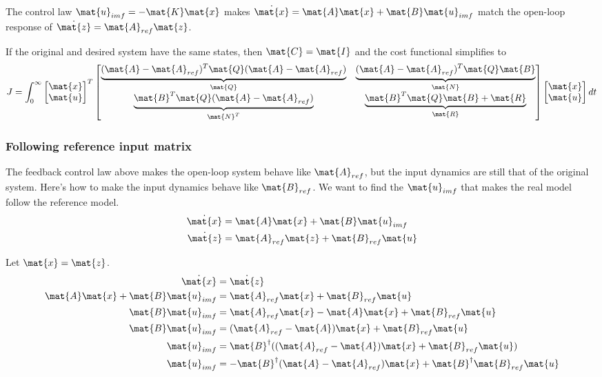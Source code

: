 The control law $\mat{u}_{imf} = -\mat{K}\mat{x}$ makes
$\dot{\mat{x}} = \mat{A}\mat{x} + \mat{B}\mat{u}_{imf}$ match the open-loop
response of $\dot{\mat{z}} = \mat{A}_{ref}\mat{z}$.

If the original and desired system have the same states, then
$\mat{C} = \mat{I}$ and the cost functional simplifies to
\begin{equation}
  J = \int_0^\infty
  \begin{bmatrix}
    \mat{x} \\
    \mat{u}
  \end{bmatrix}^T
  \begin{bmatrix}
    \underbrace{(\mat{A} - \mat{A}_{ref})^T\mat{Q}
      (\mat{A} - \mat{A}_{ref})}_{\mat{Q}} &
    \underbrace{(\mat{A} - \mat{A}_{ref})^T\mat{Q}\mat{B}}_{\mat{N}} \\
    \underbrace{\mat{B}^T\mat{Q}(\mat{A} - \mat{A}_{ref})}_{\mat{N}^T} &
    \underbrace{\mat{B}^T\mat{Q}\mat{B} + \mat{R}}_{\mat{R}}
  \end{bmatrix}
  \begin{bmatrix}
    \mat{x} \\
    \mat{u}
  \end{bmatrix}
  dt
\end{equation}

\subsubsection{Following reference input matrix}

The feedback control law above makes the open-loop system behave like
$\mat{A}_{ref}$, but the input dynamics are still that of the original system.
Here's how to make the input dynamics behave like $\mat{B}_{ref}$. We want to
find the $\mat{u}_{imf}$ that makes the real model follow the reference model.
\begin{align*}
  \dot{\mat{x}} &= \mat{A}\mat{x} + \mat{B}\mat{u}_{imf} \\
  \dot{\mat{z}} &= \mat{A}_{ref}\mat{z} + \mat{B}_{ref}\mat{u}
\end{align*}

Let $\mat{x} = \mat{z}$.
\begin{align*}
  \dot{\mat{x}} &= \dot{\mat{z}} \\
  \mat{A}\mat{x} + \mat{B}\mat{u}_{imf} &= \mat{A}_{ref}\mat{x} +
    \mat{B}_{ref}\mat{u} \\
  \mat{B}\mat{u}_{imf} &= \mat{A}_{ref}\mat{x} - \mat{A}\mat{x} +
    \mat{B}_{ref}\mat{u} \\
  \mat{B}\mat{u}_{imf} &= (\mat{A}_{ref} - \mat{A})\mat{x} +
    \mat{B}_{ref}\mat{u} \\
  \mat{u}_{imf} &= \mat{B}^\dagger ((\mat{A}_{ref} - \mat{A})\mat{x} +
    \mat{B}_{ref}\mat{u}) \\
  \mat{u}_{imf} &= -\mat{B}^\dagger (\mat{A} - \mat{A}_{ref})\mat{x} +
    \mat{B}^\dagger \mat{B}_{ref}\mat{u}
\end{align*}

